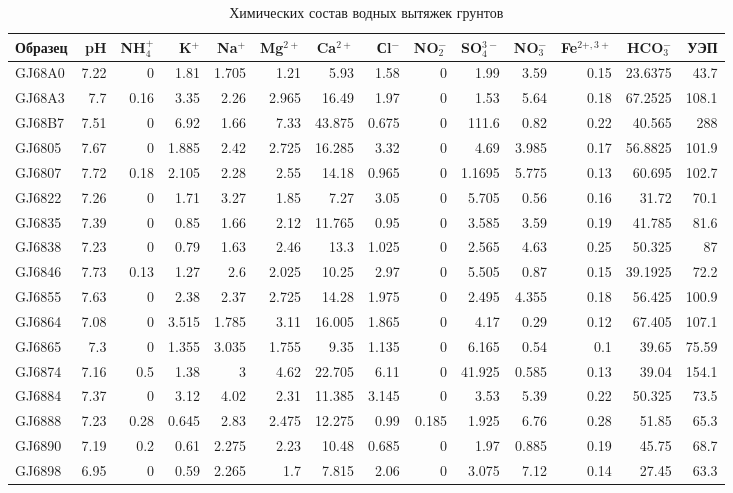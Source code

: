 \begin{table}[]
    \centering
    \tiny
    \caption{Химических состав водных вытяжек грунтов} \label{tab:chem}
    \begin{tabular}{@{}lrrrrrrrrrrrrr@{}}
    \toprule
    Образец & pH & NH$_4^+$ &	K$^+$ & Na$^+$ & Mg$^{2+}$ & Ca$^{2+}$ &	Сl$^-$ &	NO$_2^-$	   & SO$_4^{3-}$ &	NO$_3^-$ &	Fe$^{2+,3+}$ &	HCO$_3^-$   & УЭП \\ \midrule
    GJ68A0 & 7.22 & 0 & 1.81 & 1.705 & 1.21 & 5.93 & 1.58 & 0 & 1.99 & 3.59 & 0.15 & 23.6375 & 43.7 \\
    GJ68A3 & 7.7 & 0.16 & 3.35 & 2.26 & 2.965 & 16.49 & 1.97 & 0 & 1.53 & 5.64 & 0.18 & 67.2525 & 108.1 \\
    GJ68B7 & 7.51 & 0 & 6.92 & 1.66 & 7.33 & 43.875 & 0.675 & 0 & 111.6 & 0.82 & 0.22 & 40.565 & 288 \\
    GJ6805 & 7.67 & 0 & 1.885 & 2.42 & 2.725 & 16.285 & 3.32 & 0 & 4.69 & 3.985 & 0.17 & 56.8825 & 101.9 \\
    GJ6807 & 7.72 & 0.18 & 2.105 & 2.28 & 2.55 & 14.18 & 0.965 & 0 & 1.1695 & 5.775 & 0.13 & 60.695 & 102.7 \\
    GJ6822 & 7.26 & 0 & 1.71 & 3.27 & 1.85 & 7.27 & 3.05 & 0 & 5.705 & 0.56 & 0.16 & 31.72 & 70.1 \\
    GJ6835 & 7.39 & 0 & 0.85 & 1.66 & 2.12 & 11.765 & 0.95 & 0 & 3.585 & 3.59 & 0.19 & 41.785 & 81.6 \\
    GJ6838 & 7.23 & 0 & 0.79 & 1.63 & 2.46 & 13.3 & 1.025 & 0 & 2.565 & 4.63 & 0.25 & 50.325 & 87 \\
    GJ6846 & 7.73 & 0.13 & 1.27 & 2.6 & 2.025 & 10.25 & 2.97 & 0 & 5.505 & 0.87 & 0.15 & 39.1925 & 72.2 \\
    GJ6855 & 7.63 & 0 & 2.38 & 2.37 & 2.725 & 14.28 & 1.975 & 0 & 2.495 & 4.355 & 0.18 & 56.425 & 100.9 \\
    GJ6864 & 7.08 & 0 & 3.515 & 1.785 & 3.11 & 16.005 & 1.865 & 0 & 4.17 & 0.29 & 0.12 & 67.405 & 107.1 \\
    GJ6865 & 7.3 & 0 & 1.355 & 3.035 & 1.755 & 9.35 & 1.135 & 0 & 6.165 & 0.54 & 0.1 & 39.65 & 75.59 \\
    GJ6874 & 7.16 & 0.5 & 1.38 & 3 & 4.62 & 22.705 & 6.11 & 0 & 41.925 & 0.585 & 0.13 & 39.04 & 154.1 \\
    GJ6884 & 7.37 & 0 & 3.12 & 4.02 & 2.31 & 11.385 & 3.145 & 0 & 3.53 & 5.39 & 0.22 & 50.325 & 73.5 \\
    GJ6888 & 7.23 & 0.28 & 0.645 & 2.83 & 2.475 & 12.275 & 0.99 & 0.185 & 1.925 & 6.76 & 0.28 & 51.85 & 65.3 \\
    GJ6890 & 7.19 & 0.2 & 0.61 & 2.275 & 2.23 & 10.48 & 0.685 & 0 & 1.97 & 0.885 & 0.19 & 45.75 & 68.7 \\
    GJ6898 & 6.95 & 0 & 0.59 & 2.265 & 1.7 & 7.815 & 2.06 & 0 & 3.075 & 7.12 & 0.14 & 27.45 & 63.3 \\
    \bottomrule 
    \end{tabular}
    \\ 
\end{table}

